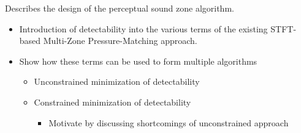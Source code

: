 Describes the design of the perceptual sound zone algorithm.
\begin{itemize}
    \item Introduction of detectability into the various terms of the existing STFT-based Multi-Zone Pressure-Matching
        approach.
    \item Show how these terms can be used to form multiple algorithms
        \begin{itemize}
            \item Unconstrained minimization of detectability 
            \item Constrained minimization of detectability
                \begin{itemize}
                    \item Motivate by discussing shortcomings of unconstrained approach
                \end{itemize}
        \end{itemize}
\end{itemize}
